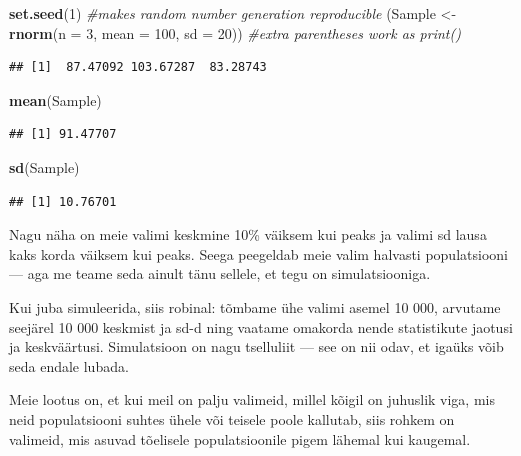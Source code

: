\documentclass[]{book}
\newenvironment{Shaded}{\begin{snugshade}}{\end{snugshade}}
\newcommand{\KeywordTok}[1]{\textcolor[rgb]{0.13,0.29,0.53}{\textbf{#1}}}
\newcommand{\DataTypeTok}[1]{\textcolor[rgb]{0.13,0.29,0.53}{#1}}
\newcommand{\DecValTok}[1]{\textcolor[rgb]{0.00,0.00,0.81}{#1}}
\newcommand{\StringTok}[1]{\textcolor[rgb]{0.31,0.60,0.02}{#1}}
\newcommand{\CommentTok}[1]{\textcolor[rgb]{0.56,0.35,0.01}{\textit{#1}}}
\newcommand{\NormalTok}[1]{#1}
\begin{document}
\begin{Shaded}
\begin{Highlighting}[]
\KeywordTok{set.seed}\NormalTok{(}\DecValTok{1}\NormalTok{) }\CommentTok{#makes random number generation reproducible}
\NormalTok{(Sample <-}\StringTok{ }\KeywordTok{rnorm}\NormalTok{(}\DataTypeTok{n =} \DecValTok{3}\NormalTok{, }\DataTypeTok{mean =} \DecValTok{100}\NormalTok{, }\DataTypeTok{sd =} \DecValTok{20}\NormalTok{)) }\CommentTok{#extra parentheses work as print()}
\end{Highlighting}
\end{Shaded}

\begin{verbatim}
## [1]  87.47092 103.67287  83.28743
\end{verbatim}

\begin{Shaded}
\begin{Highlighting}[]
\KeywordTok{mean}\NormalTok{(Sample)}
\end{Highlighting}
\end{Shaded}

\begin{verbatim}
## [1] 91.47707
\end{verbatim}

\begin{Shaded}
\begin{Highlighting}[]
\KeywordTok{sd}\NormalTok{(Sample)}
\end{Highlighting}
\end{Shaded}

\begin{verbatim}
## [1] 10.76701
\end{verbatim}

Nagu näha on meie valimi keskmine 10\% väiksem kui peaks ja valimi sd
lausa kaks korda väiksem kui peaks. Seega peegeldab meie valim halvasti
populatsiooni --- aga me teame seda ainult tänu sellele, et tegu on
simulatsiooniga.

Kui juba simuleerida, siis robinal: tõmbame ühe valimi asemel 10 000,
arvutame seejärel 10 000 keskmist ja sd-d ning vaatame omakorda nende
statistikute jaotusi ja keskväärtusi. Simulatsioon on nagu tselluliit
--- see on nii odav, et igaüks võib seda endale lubada.

Meie lootus on, et kui meil on palju valimeid, millel kõigil on juhuslik
viga, mis neid populatsiooni suhtes ühele või teisele poole kallutab,
siis rohkem on valimeid, mis asuvad tõelisele populatsioonile pigem
lähemal kui kaugemal.
\end{document}
